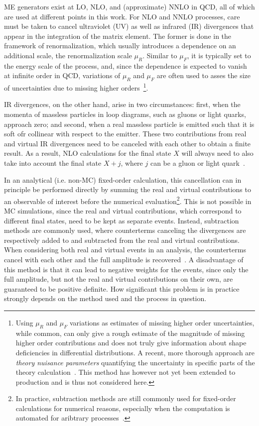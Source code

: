 ME generators exist at LO, NLO, and (approximate) NNLO in QCD, all of which are used at different points in this work. For NLO and NNLO processes, care must be taken to cancel ultraviolet (UV) as well as infrared (IR) divergences that appear in the integration of the matrix element. The former is done in the framework of renormalization, which usually introduces a dependence on an additional scale, the renormalization scale $\mu_R$. Similar to $\mu_F$, it is typically set to the energy scale of the process, and, since the dependence is expected to vanish at infinite order in QCD, variations of $\mu_R$ and $\mu_F$ are often used to asses the size of uncertainties due to missing higher orders~\cite{Schwartz:2014sze}\footnote{Using $\mu_R$ and $\mu_F$ variations as estimates of missing higher order uncertainties, while common, can only give a rough estimate of the magnitude of missing higher order contributions and does not truly give information about shape deficiencies in differential distributions. A recent, more thorough approach are \textit{theory nuisance parameters} quantifying the uncertainty in specific parts of the theory calculation~\cite{Tackmann:2024kci}. This method has however not yet been extended to \ttbar production and is thus not considered here.}.

IR divergences, on the other hand, arise in two circumstances: first, when the momenta of massless particles in loop diagrams, such as gluons or light quarks, approach zero; and second, when a real massless particle is emitted such that it is soft ofr collinear with respect to the emitter. These two contributions from real and virtual IR divergences need to be canceled with each other to obtain a finite result. As a result, NLO calculations for the final state $X$ will always need to also take into account the final state $X+j$, where $j$ can be a gluon or light quark~\cite{Nason:2012pr}. 

In an analytical (i.e. non-MC) fixed-order calculation, this cancellation can in principle be performed directly by summing the real and virtual contributions to an observable of interest before the numerical evaluation\footnote{In practice, subtraction methods are still commonly used for fixed-order calculations for numerical reasons, especially when the computation is automated for aribtrary processes~\cite{Skands:2012ts}.}. This is not possible in MC simulations, since the real and virtual contributions, which correspond to different final states, need to be kept as separate events. Instead, subtraction methods are commonly used, where counterterms canceling the divergences are respectively added to and subtracted from the real and virtual contributions. When considering both real and virtual events in an analysis, the counterterms cancel with each other and the full amplitude is recovered~\cite{Skands:2012ts}. A disadvantage of this method is that it can lead to negative weights for the events, since only the full amplitude, but not the real and virtual contributions on their own, are guaranteed to be positive definite. How significant this problem is in practice strongly depends on the method used and the process in question.

